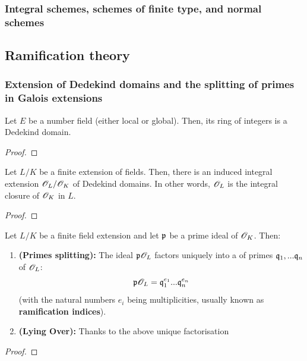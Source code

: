         \subsubsection{Integral schemes, schemes of finite type, and normal schemes}
    
    \subsection{Ramification theory}
        \subsubsection{Extension of Dedekind domains and the splitting of primes in Galois extensions}
            \begin{lemma}
                Let $E$ be a number field (either local or global). Then, its ring of integers is a Dedekind domain. 
            \end{lemma}
                \begin{proof}
                     
                \end{proof}
                
            \begin{theorem}
                Let $L/K$ be a finite extension of fields. Then, there is an induced integral extension $\mathscr{O}_L/\mathscr{O}_K$ of Dedekind domains. In other words, $\mathscr{O}_L$ is the integral closure of $\mathscr{O}_K$ in $L$. 
            \end{theorem}
                \begin{proof}
                    
                \end{proof}
            \begin{corollary} \label{coro: prime_splitting_finite_extensions}
                Let $L/K$ be a finite field extension and let $\mathfrak{p}$ be a prime ideal of $\mathscr{O}_K$. Then:
                    \begin{enumerate}
                        \item \textbf{(Primes splitting):} The ideal $\mathfrak{p}\mathscr{O}_L$ factors uniquely into a  of primes $\mathfrak{q}_1, ...\mathfrak{q}_n$ of $\mathscr{O}_L$:
                            $$\mathfrak{p}\mathscr{O}_L = \mathfrak{q}_1^{e_1}...\mathfrak{q}_n^{e_n}$$
                        (with the natural numbers $e_i$ being multiplicities, usually known as \textbf{ramification indices}).
                        \item \textbf{(Lying Over):} Thanks to the above unique factorisation 
                    \end{enumerate}
            \end{corollary}
                \begin{proof}
                    
                \end{proof}
                
